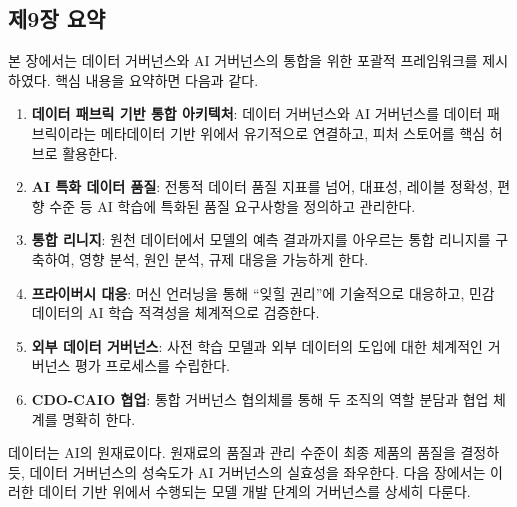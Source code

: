 \subsection*{제9장 요약}

본 장에서는 데이터 거버넌스와 AI 거버넌스의 통합을 위한 포괄적 프레임워크를 제시하였다. 핵심 내용을 요약하면 다음과 같다.

\begin{enumerate}
 \item \textbf{데이터 패브릭 기반 통합 아키텍처}: 데이터 거버넌스와 AI 거버넌스를 데이터 패브릭이라는 메타데이터 기반 위에서 유기적으로 연결하고, 피처 스토어를 핵심 허브로 활용한다.
 \item \textbf{AI 특화 데이터 품질}: 전통적 데이터 품질 지표를 넘어, 대표성, 레이블 정확성, 편향 수준 등 AI 학습에 특화된 품질 요구사항을 정의하고 관리한다.
 \item \textbf{통합 리니지}: 원천 데이터에서 모델의 예측 결과까지를 아우르는 통합 리니지를 구축하여, 영향 분석, 원인 분석, 규제 대응을 가능하게 한다.
 \item \textbf{프라이버시 대응}: 머신 언러닝을 통해 ``잊힐 권리''에 기술적으로 대응하고, 민감 데이터의 AI 학습 적격성을 체계적으로 검증한다.
 \item \textbf{외부 데이터 거버넌스}: 사전 학습 모델과 외부 데이터의 도입에 대한 체계적인 거버넌스 평가 프로세스를 수립한다.
 \item \textbf{CDO-CAIO 협업}: 통합 거버넌스 협의체를 통해 두 조직의 역할 분담과 협업 체계를 명확히 한다.
\end{enumerate}

데이터는 AI의 원재료이다. 원재료의 품질과 관리 수준이 최종 제품의 품질을 결정하듯, 데이터 거버넌스의 성숙도가 AI 거버넌스의 실효성을 좌우한다. 다음 장에서는 이러한 데이터 기반 위에서 수행되는 모델 개발 단계의 거버넌스를 상세히 다룬다.
